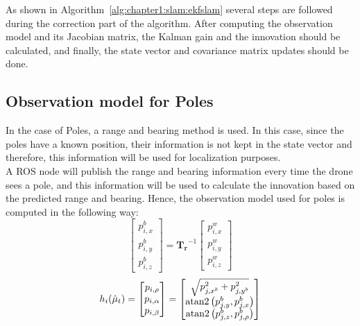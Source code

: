 As shown in Algorithm~\ref{alg:chapter1:slam:ekfslam} several steps are followed during the correction part of the algorithm. After computing the observation model and its Jacobian matrix, the Kalman gain and the innovation should be calculated, and finally, the state vector and covariance matrix updates should be done.

\subsection{Observation model for Poles}
\label{subsec:chapter2:correction:poles}
In the case of Poles, a range and bearing method is used. In this case, since the poles have a known position, their information is not kept in the state vector and therefore, this information will be used for localization purposes.\\

A ROS node will publish the range and bearing information every time the drone sees a pole, and this information will be used to calculate the innovation based on the predicted range and bearing. Hence, the observation model used for poles is computed in the following way:
\begin{equation}
    \begin{bmatrix}
        p_{i, x}^b \\ p_{i, y}^b \\ p_{i, z}^b
    \end{bmatrix} = \bm{T_r}^{-1} \begin{bmatrix}
        p_{i, x}^w \\ p_{i, y}^w \\ p_{i, z}^w
\end{bmatrix}
\label{eq:chapter2:correction:pole:world2body_transform}
\end{equation}
\begin{equation}
    h_i(\hat\mu_t) = \begin{bmatrix}
        p_{i, \rho} \\ p_{i, \alpha} \\ p_{i, \beta}
    \end{bmatrix} = \begin{bmatrix}
    \sqrt{ p_{j, x^b}^2 + p_{j, y^b}^2 } \\
    \operatorname{atan2}\left(p_{j, y}^b, p_{j, x}^b\right) \\
    \operatorname{atan2}\left(p_{j, z}^b, p_{j,\rho}^b\right)
\end{bmatrix}
\label{eq:chapter2:correction:pole:range_bearing}
\end{equation}

